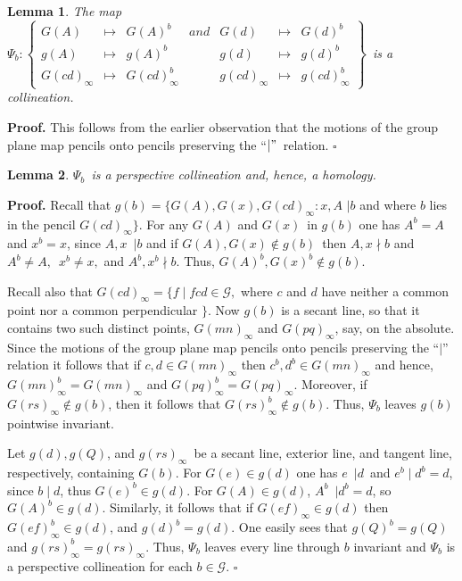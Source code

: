 \documentclass[a4paper,twoside,12pt]{article}
\newtheorem{lemma}{Lemma}[section]
\newenvironment{proof}{\medskip \noindent 
            {\bf Proof.}}{ \hfill $\square$ \medskip}
\begin{document}
\begin{lemma} The map $\Psi _{b}:\left\{ 
\begin{array}{ccccccc}
G(A) & \longmapsto  & G(A)^{b} & and & G(d) & \longmapsto  & G(d)^{b} \\ 
g(A) & \longmapsto  & g(A)^{b} &  & g(d) & \longmapsto  & g(d)^{b} \\ 
G(cd)_{\infty } & \longmapsto  & G(cd)_{\infty }^{b} &  & g(cd)_{\infty } & 
\longmapsto  & g(cd)_{\infty }^{b}%
\end{array}%
\right\} $\ is a collineation.
\end{lemma}

\begin{proof} This follows from the earlier observation that the motions
of the group plane map pencils onto pencils preserving the ``$|"$\ relation.
\end{proof}

\begin{lemma} $\Psi _{b}$\ is a perspective collineation and, hence, a
homology.
\end{lemma}

\begin{proof} Recall that $g(b)=\{G(A),G(x),G(cd)_{\infty }:x,A$ $|b$
and where $b$ lies in the pencil $G(cd)_{\infty }\}$. For any $G(A)$
and $G(x)$\ in $g(b)$ one has $A^{b}=A$ and $x^{b}=x$, since $A,x$\ $|b$
and if $G(A),G(x)\notin g(b)$\ then 
$A,x \nmid b$ and $A^{b}\neq A,$\ $x^{b}\neq x,$ and 
$A^{b},x^{b}\nmid b$. Thus, $G(A)^{b},G(x)^{b}\notin g(b)$.

   Recall also that $G(cd)_{\infty} = \{f \mid fcd\in \mathcal{G},$
where $c$ and $d$ have neither a common point nor a common perpendicular $\}$. 
Now $g(b)$ is a secant line, so that it contains two such distinct points, 
$G(mn)_{\infty}$ and $G(pq)_{\infty }$, say, on the absolute. Since the
motions of the group plane map pencils onto pencils preserving the ``$|$''
relation it follows that if $c,d\in G(mn)_{\infty}$ then 
$c^{b},d^{b}\in G(mn)_{\infty }$ and hence, 
$G(mn)_{\infty}^{b}=G(mn)_{\infty }$ and $G(pq)_{\infty }^{b}=G(pq)_{\infty}$.
Moreover, if $G(rs)_{\infty }\notin g(b)$, then it follows that 
$G(rs)_{\infty }^{b}\notin g(b)$. Thus, $\Psi_{b}$ leaves $g(b)$
pointwise invariant.

     Let $g(d), g(Q)$, and $g(rs)_{\infty }$\ be a secant line,
exterior line, and tangent line, respectively, containing $G(b).$ For 
$G(e)\in g(d)$ one has $e$\ $|d$\ and $e^{b}\mid d^{b}=d$, since $b\mid d$,
thus $G(e)^{b}\in g(d)$. For $G(A)\in g(d)$, $A^{b}$\ $|d^{b}=d$, so 
$G(A)^{b}\in g(d)$. Similarly, it follows that if $G(ef)_{\infty }\in g(d)$
then $G(ef)_{\infty }^{b}\in g(d)$, and $g(d)^{b}=g(d)$. One easily
sees that $g(Q)^{b}=g(Q)$ and $g(rs)_{\infty }^{b}=g(rs)_{\infty }$.
Thus, $\Psi _{b}$ leaves every line through $b$ invariant and $\Psi_{b}$
is a perspective collineation for each $b\in \mathcal{G}$.
\end{proof}
\end{document}
